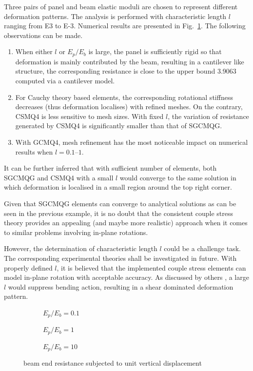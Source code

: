 \documentclass[3p,sort&compress,11pt,fleqn]{elsarticle}
\newcommand*{\figref}[1]{Fig.~\ref{#1}}
\begin{document}
Three pairs of panel and beam elastic moduli are chosen to represent different deformation patterns. The analysis is performed with characteristic length $l$ ranging from \num[print-unity-mantissa=false]{E3} to \num[print-unity-mantissa=false]{E-3}. Numerical results are presented in \figref{fig:joint}. The following observations can be made.
\begin{enumerate}
\item When either $l$ or $E_p/E_b$ is large, the panel is sufficiently rigid so that deformation is mainly contributed by the beam, resulting in a cantilever like structure, the corresponding resistance is close to the upper bound \num{3.9063} computed via a cantilever model.
\item For Cauchy theory based elements, the corresponding rotational stiffness decreases (thus deformation localises) with refined meshes. On the contrary, CSMQ4 is less sensitive to mesh sizes. With fixed $l$, the variation of resistance generated by CSMQ4 is significantly smaller than that of SGCMQG.
\item With GCMQ4, mesh refinement has the most noticeable impact on numerical results when $l=\numrange{0.1}{1}$.
\end{enumerate}

It can be further inferred that with sufficient number of elements, both SGCMQG and CSMQ4 with a small $l$ would converge to the same solution in which deformation is localised in a small region around the top right corner.

Given that SGCMQG elements can converge to analytical solutions as can be seen in the previous example, it is no doubt that the consistent couple stress theory provides an appealing (and maybe more realistic) approach when it comes to similar problems involving in-plane rotations.

However, the determination of characteristic length $l$ could be a challenge task. The corresponding experimental theories shall be investigated in future. With properly defined $l$, it is believed that the implemented couple stress elements can model in-plane rotation with acceptable accuracy. As discussed by others \citep[e.g.,][]{Darrall2013}, a large $l$ would suppress bending action, resulting in a shear dominated deformation pattern.
\begin{figure}[htb]
\centering\footnotesize
\begin{subfigure}[b]{.99\textwidth}\centering

\caption{$E_p/E_b=0.1$}
\end{subfigure}
\begin{subfigure}[b]{.99\textwidth}\centering

\caption{$E_p/E_b=1$}
\end{subfigure}
\begin{subfigure}[b]{.99\textwidth}\centering

\caption{$E_p/E_b=10$}
\end{subfigure}
\caption{beam end resistance subjected to unit vertical displacement}\label{fig:joint}
\end{figure}
\end{document}
